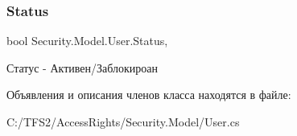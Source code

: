 \mbox{\label{class_security_1_1_model_1_1_user_a172bd19370bbd6fdc089660cbef19b57}} 
\subsubsection{\texorpdfstring{Status}{Status}}
{\footnotesize\ttfamily bool Security.\+Model.\+User.\+Status\hspace{0.3cm}{\ttfamily [get]}, {\ttfamily [set]}}



Статус -\/ Активен/Заблокироан 



Объявления и описания членов класса находятся в файле\+:\begin{DoxyCompactItemize}
\item 
C\+:/\+T\+F\+S2/\+Access\+Rights/\+Security.\+Model/User.\+cs\end{DoxyCompactItemize}
